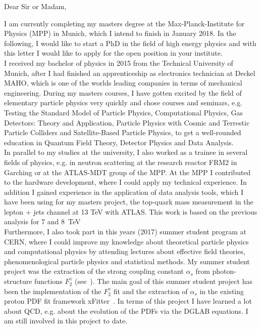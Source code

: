 \documentclass[10pt]{article}
\begin{document}
	

\noindent Dear Sir or Madam,
\vspace{1.0cm}

\noindent I am currently completing my masters degree at the Max-Planck-Institute for Physics (MPP) in Munich, which I intend to finish in January 2018. In the following, I would like to start a PhD in the field of high energy physics and with this letter I would like to apply for the open position in your institute.\\

\noindent I received my bachelor of physics in 2015 from the Technical University of Munich, after I had finished an apprenticeship as electronics technician at Deckel MAHO, which is one of the worlds leading companies in terms of mechanical engineering. During my masters courses, I have gotten excited by the field of elementary particle physics very quickly and chose courses and seminars, e.g. Testing the Standard Model of Particle Physics, Computational Physics, Gas Detectors: Theory and Application, Particle Physics with Cosmic and Terrestic Particle Colliders and Satellite-Based Particle Physics, to get a well-rounded education in Quantum Field Theory, Detector Physics and Data Analysis.\\

\noindent In parallel to my studies at the university, I also worked as a trainee in several fields of physics, e.g. in neutron scattering at the research reactor FRM2 in Garching or at the ATLAS-MDT group of the MPP. At the MPP I contributed to the hardware development, where I could apply my technical experience. In addition I gained experience in the application of data analysis tools, which I have been using for my masters project, the top-quark mass measurement in the lepton + jets channel at 13 TeV with ATLAS. This work is based on the previous analysis for 7 and 8~TeV \cite{Aad:2015nba,ATLAS:2017lqh} \\

\noindent Furthermore, I also took part in this years (2017) summer student program at CERN, where I could improve my knowledge about theoretical particle physics and computational physics by attending lectures about effective field theories, phenomenological particle physics and statistical methods. My summer student project was the extraction of the strong coupling constant $\alpha_s$ from photon-structure functions $F_2^{\gamma}$ (see~\cite{Albino:2002ck}). The main goal of this summer student project has been the implementation of the $F_2^{\gamma}$ fit and the extraction of $\alpha_s$ in the existing proton PDF fit framework xFitter~\cite{Alekhin:2014irh}. In terms of this project I have learned a lot about QCD, e.g. about the evolution of the PDFs via the DGLAB equations. I am still involved in this project to date.\\
\end{document}
